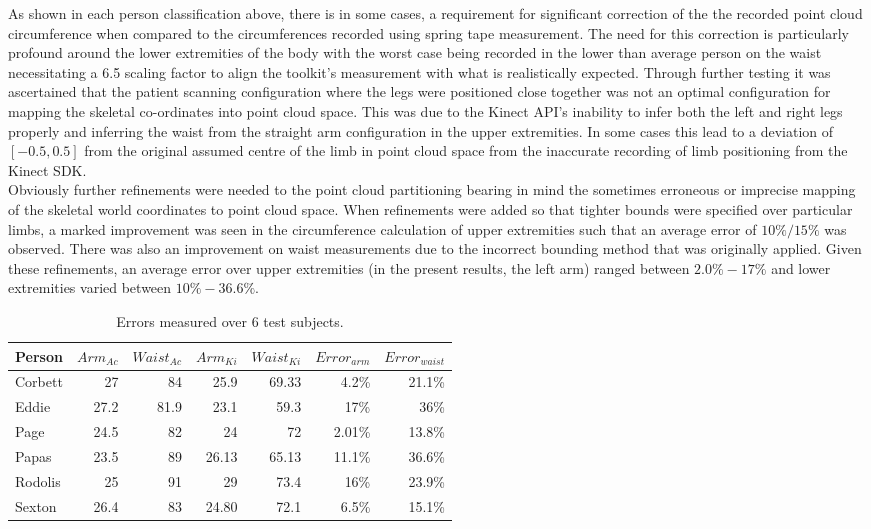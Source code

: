 As shown in each person classification above, there is in some cases, a requirement for significant correction of the the recorded point cloud circumference when compared to the circumferences recorded using spring tape measurement. The need for this correction is particularly profound around the lower extremities of the body with the worst case being recorded in the lower than average person on the waist necessitating a 6.5 scaling factor to align the toolkit's measurement with what is realistically expected. Through further testing it was ascertained that the patient scanning configuration where the legs were positioned close together was not an optimal configuration for mapping the skeletal co-ordinates into point cloud space. This was due to the Kinect API's inability to infer both the left and right legs properly and inferring the waist from the straight arm configuration in the upper extremities. In some cases this lead to a deviation of $[-0.5,0.5]$ from the original assumed centre of the limb in point cloud space from the inaccurate recording of limb positioning from the Kinect SDK. \\

Obviously further refinements were needed to the point cloud partitioning bearing in mind the sometimes erroneous or imprecise mapping of the skeletal world coordinates to point cloud space. When refinements were added so that tighter bounds were specified over particular limbs, a marked improvement was seen in the circumference calculation of upper extremities such that an average error of $10\%/15\%$ was observed. There was also an improvement on waist measurements due to the incorrect bounding method that was originally applied. Given these refinements, an average error over upper extremities (in the present results, the left arm) ranged between $2.0\% - 17\%$ and lower extremities varied between $10\%-36.6\%$. \\

\begin{table}[!htb]
\begin{center}
  \begin{tabular}{| l | r | r | r | r | r | r |}
    \hline
    Person & $Arm_{Ac}$ & $Waist_{Ac}$ & $Arm_{Ki}$ & $Waist_{Ki}$ & $Error_{arm}$ & $Error_{waist}$  \\ \hline
    Corbett & 27 & 84 & 25.9 & 69.33 & 4.2\% & 21.1\% \\ \hline
    Eddie & 27.2 & 81.9 & 23.1 & 59.3 & 17\% & 36\% \\ \hline
    Page & 24.5 & 82 & 24 & 72 & 2.01\% & 13.8\% \\ \hline
    Papas & 23.5 & 89 & 26.13 & 65.13 & 11.1\% & 36.6\% \\ \hline
    Rodolis & 25 & 91 & 29 & 73.4 & 16\% & 23.9\% \\ \hline
    Sexton & 26.4 & 83 & 24.80 & 72.1 & 6.5\% & 15.1\%\\ \hline
  \end{tabular}
\end{center}
\caption{Errors measured over 6 test subjects.}
\label{testing: table of data for limb transform constants}
\end{table}

